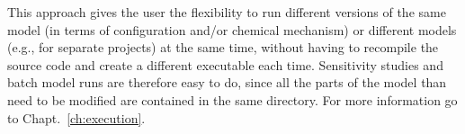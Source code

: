 This approach gives the user the flexibility to run different versions
of the same model (in terms of configuration and/or chemical
mechanism) or different models (e.g., for separate projects) at the
same time, without having to recompile the source code and create a
different executable each time. Sensitivity studies and batch model
runs are therefore easy to do, since all the parts of the model than
need to be modified are contained in the same directory. For more
information go to Chapt.~\ref{ch:execution}.
